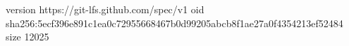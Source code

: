version https://git-lfs.github.com/spec/v1
oid sha256:5ecf396e891c1ea0c72955668467b0d99205abcb8f1ae27a0f4354213ef52484
size 12025
